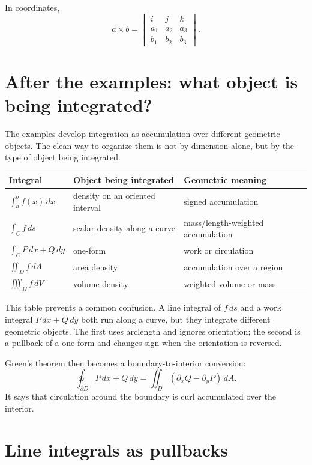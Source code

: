 In coordinates,
\[
  a\times b=
  \begin{vmatrix}
  i&j&k\\
  a_1&a_2&a_3\\
  b_1&b_2&b_3
  \end{vmatrix}.
\]

\section{After the examples: what object is being integrated?}

The examples develop integration as accumulation over different geometric objects.  The clean way to organize them is not by dimension alone, but by the type of object being integrated.

\begin{center}
\small
\begin{tabularx}{\textwidth}{@{}lYY@{}}
\toprule
Integral & Object being integrated & Geometric meaning\\
\midrule
\(\int_a^b f(x)\,dx\) & density on an oriented interval & signed accumulation\\
\(\int_C f\,ds\) & scalar density along a curve & mass/length-weighted accumulation\\
\(\int_C P\,dx+Q\,dy\) & one-form & work or circulation\\
\(\iint_D f\,dA\) & area density & accumulation over a region\\
\(\iiint_\Omega f\,dV\) & volume density & weighted volume or mass\\
\bottomrule
\end{tabularx}
\end{center}

This table prevents a common confusion.  A line integral of \(f\,ds\) and a work integral \(P\,dx+Q\,dy\) both run along a curve, but they integrate different geometric objects.  The first uses arclength and ignores orientation; the second is a pullback of a one-form and changes sign when the orientation is reversed.

Green's theorem then becomes a boundary-to-interior conversion:
\[
\oint_{\partial D}P\,dx+Q\,dy
=
\iint_D(\partial_x Q-\partial_y P)\,dA.
\]
It says that circulation around the boundary is curl accumulated over the interior.

\section{Line integrals as pullbacks}

